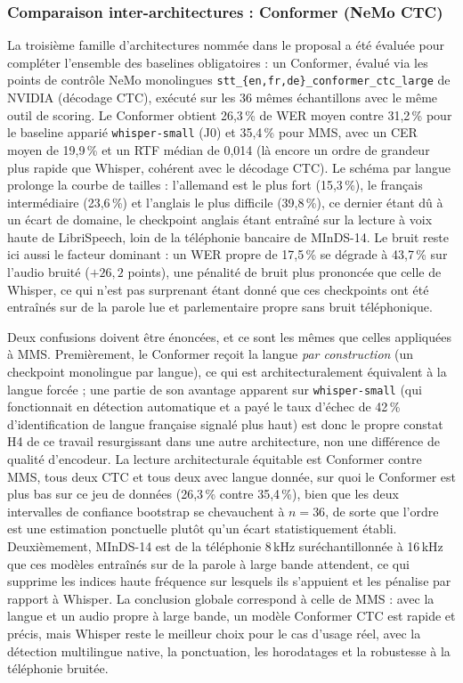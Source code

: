 \documentclass[12pt]{report}
\begin{document}
\subsubsection{Comparaison inter-architectures : Conformer (NeMo CTC)}
La troisième famille d'architectures nommée dans le proposal a été évaluée pour compléter l'ensemble des baselines obligatoires : un Conformer, évalué via les points de contrôle NeMo monolingues \texttt{stt\_\{en,fr,de\}\_conformer\_ctc\_large} de NVIDIA (décodage CTC), exécuté sur les 36 mêmes échantillons avec le même outil de scoring. Le Conformer obtient 26,3\,\% de WER moyen contre 31,2\,\% pour le baseline apparié \texttt{whisper-small} (J0) et 35,4\,\% pour MMS, avec un CER moyen de 19,9\,\% et un RTF médian de 0,014 (là encore un ordre de grandeur plus rapide que Whisper, cohérent avec le décodage CTC). Le schéma par langue prolonge la courbe de tailles : l'allemand est le plus fort (15,3\,\%), le français intermédiaire (23,6\,\%) et l'anglais le plus difficile (39,8\,\%), ce dernier étant dû à un écart de domaine, le checkpoint anglais étant entraîné sur la lecture à voix haute de LibriSpeech, loin de la téléphonie bancaire de MInDS-14. Le bruit reste ici aussi le facteur dominant : un WER propre de 17,5\,\% se dégrade à 43,7\,\% sur l'audio bruité ($+26{,}2$ points), une pénalité de bruit plus prononcée que celle de Whisper, ce qui n'est pas surprenant étant donné que ces checkpoints ont été entraînés sur de la parole lue et parlementaire propre sans bruit téléphonique.

Deux confusions doivent être énoncées, et ce sont les mêmes que celles appliquées à MMS. Premièrement, le Conformer reçoit la langue \emph{par construction} (un checkpoint monolingue par langue), ce qui est architecturalement équivalent à la langue forcée ; une partie de son avantage apparent sur \texttt{whisper-small} (qui fonctionnait en détection automatique et a payé le taux d'échec de 42\,\% d'identification de langue française signalé plus haut) est donc le propre constat H4 de ce travail resurgissant dans une autre architecture, non une différence de qualité d'encodeur. La lecture architecturale équitable est Conformer contre MMS, tous deux CTC et tous deux avec langue donnée, sur quoi le Conformer est plus bas sur ce jeu de données (26,3\,\% contre 35,4\,\%), bien que les deux intervalles de confiance bootstrap se chevauchent à $n=36$, de sorte que l'ordre est une estimation ponctuelle plutôt qu'un écart statistiquement établi. Deuxièmement, MInDS-14 est de la téléphonie 8\,kHz suréchantillonnée à 16\,kHz que ces modèles entraînés sur de la parole à large bande attendent, ce qui supprime les indices haute fréquence sur lesquels ils s'appuient et les pénalise par rapport à Whisper. La conclusion globale correspond à celle de MMS : avec la langue et un audio propre à large bande, un modèle Conformer CTC est rapide et précis, mais Whisper reste le meilleur choix pour le cas d'usage réel, avec la détection multilingue native, la ponctuation, les horodatages et la robustesse à la téléphonie bruitée.
\end{document}
